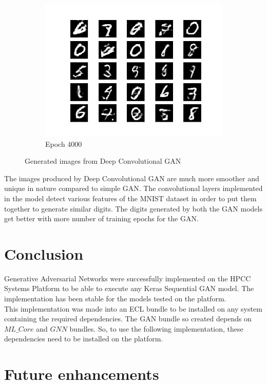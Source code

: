 \documentclass[conference]{IEEEtran}
\begin{document}
\begin{figure}[htbp]
\begin{subfigure}[b]{\columnwidth}
         \centering
         \includegraphics[width=\textwidth,keepaspectratio]{DCGAN_4000.png}
         \caption{Epoch 4000}
         \label{fig:dcgan4000}
     \end{subfigure}
        \caption{Generated images from Deep Convolutional GAN}
        \label{fig:dcgan_out}
\end{figure}

The images produced by Deep Convolutional GAN are much more smoother and unique in nature compared to simple GAN. The convolutional layers implemented in the model detect various features of the MNIST dataset in order to put them together to generate similar digits. The digits generated by both the GAN models get better with more number of training epochs for the GAN.  

\section{Conclusion}

Generative Adversarial Networks were successfully implemented on the HPCC Systems Platform to be able to execute any Keras Sequential GAN model. The implementation has been stable for the models tested on the platform. 
\\
This implementation was made into an ECL bundle to be installed on any system containing the required dependencies. The GAN bundle so created depends on $ML\_Core$ and $GNN$ bundles. So, to use the following implementation, these dependencies need to be installed on the platform. 

\section{Future enhancements}
\end{document}
